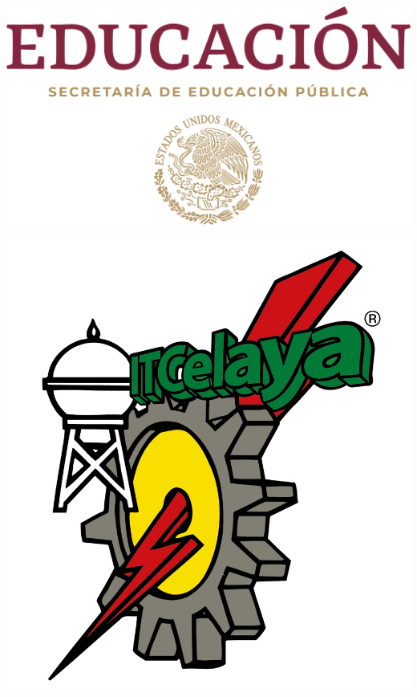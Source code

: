 \begin{titlepage}
    \begin{center}
        \begin{minipage}{0.25\textwidth} %
            \begin{flushleft}
                \includegraphics[scale=0.08]{img/portada/logo-sep-vertical.png} %
            \end{flushleft}
        \end{minipage}
        \hfill
        \begin{minipage}{0.4\textwidth} %
            \begin{center}
                \MakeUppercase{\nombreUniversidad}
            \end{center}
        \end{minipage}
        \hfill
        \begin{minipage}{0.25\textwidth} %
            \begin{flushright}
                \includegraphics[scale=0.045]{img/portada/logo-itc.png} %

\end{flushright}
\end{minipage}
\end{center}
\end{titlepage}
